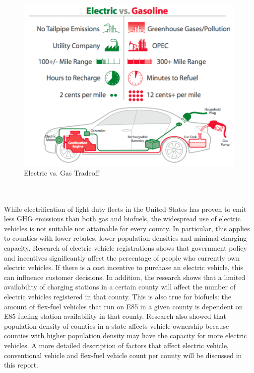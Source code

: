 \documentclass[answers]{exam}
\begin{document}
\begin{figure}[h]
    \centering
    \includegraphics[scale=0.25]{ev_vs_gas.png}
    \caption{Electric vs. Gas Tradeoff\cite{what is an EV}}
    \label{fig:my_label}
\end{figure}
\\~\\
While electrification of light duty fleets in the United States has proven to emit less GHG emissions than both gas and biofuels, the widespread use of electric vehicles is not suitable nor attainable for every county. In particular, this applies to counties with lower rebates, lower population densities and minimal charging capacity. Research of electric vehicle registrations shows that government policy and incentives significantly affect the percentage of people who currently own electric vehicles. If there is a cost incentive to purchase an electric vehicle, this can influence customer decisions. In addition, the research shows that a limited availability of charging stations in a certain county will affect the number of electric vehicles registered in that county. This is also true for biofuels: the amount of flex-fuel vehicles that run on E85 in a given county is dependent on E85 fueling station availability in that county. Research also showed that population density of counties in a state affects vehicle ownership because counties with higher population density may have the capacity for more electric vehicles. A more detailed description of factors that affect electric vehicle, conventional vehicle and flex-fuel vehicle count per county will be discussed in this report.
\\ ~\\
\end{document}
